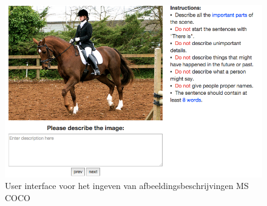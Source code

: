 \begin{figure}[tb]
    \centering
    \includegraphics[width=0.8\linewidth]{Images/coco_UI.png}
    \caption{User interface voor het ingeven van afbeeldingsbeschrijvingen MS COCO\cite{Rampf2015}}
    \label{fig:coco_ui}
\end{figure}

